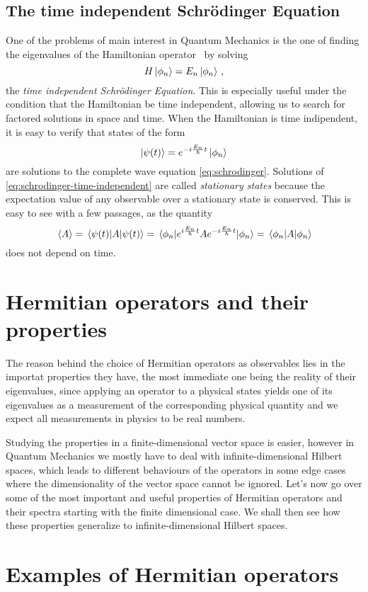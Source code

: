         \subsection{The time independent Schr\"odinger Equation}
            One of the problems of main interest in Quantum Mechanics is the one of finding the eigenvalues of the Hamiltonian operator \hH\ by solving 
            \begin{equation}
                \label{eq:schrodinger-time-independent}
                {H}\ket{\phi_n} = E_n\ket{\phi_n}
                \,\text{,}
            \end{equation}
            the \emph{time independent Schr\"odinger Equation}.
            This is especially useful under the condition that the Hamiltonian be time independent, allowing us to search for factored solutions in space and time. When the Hamiltonian is time indipendent, it is easy to verify that states of the form
            \begin{equation*}
                \ket{\psi\pqty{t}} = \myexp{-i\frac{E_n}{\hbar}t}\ket{\phi_n}
            \end{equation*}
            are solutions to the complete wave equation \eqref{eq:schrodinger}. Solutions of \eqref{eq:schrodinger-time-independent} are called \emph{stationary states} because the expectation value of any observable over a stationary state is conserved. This is easy to see with a few passages, as the quantity
            \begin{equation*}
                \ev*{\togglehat{A}}
                = \ev{\togglehat{A}}{\psi\pqty{t}}
                = \ev{\myexp{i\frac{E_n}{\hbar}t}\togglehat{A}\myexp{-i\frac{E_n}{\hbar}t}}{\phi_n}
                = \ev{\togglehat{A}}{\phi_n}
            \end{equation*}
            does not depend on time.

    \section{Hermitian operators and their properties}
        The reason behind the choice of Hermitian operators as observables lies in the importat properties they have, the most immediate one being the reality of their eigenvalues, since applying an operator to a physical states yields one of its eigenvalues as a measurement of the corresponding physical quantity and we expect all measurements in physics to be real numbers.
        
        Studying the properties in a finite-dimensional vector space is easier, however in Quantum Mechanics we mostly have to deal with infinite-dimensional Hilbert spaces, which leads to different behaviours of the operators in some edge cases where the dimensionality of the vector space cannot be ignored. Let's now go over some of the most important and useful properties of Hermitian operators and their spectra \cite{Bernardini1993-iy} starting with the finite dimensional case. We shall then see how these properties generalize to infinite-dimensional Hilbert spaces.
        
        
    \section{Examples of Hermitian operators}
